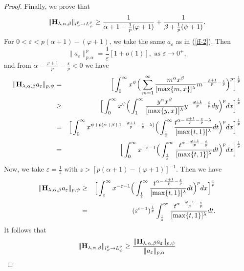\documentclass[10pt]{amsart}
\theoremstyle{definition}    %
\numberwithin{equation}{section}
\begin{document}
\begin{proof}
Finally, we prove that  $$\|{\bf H}_{\lambda, \alpha, \beta}\|_{l_{\varphi}^{p}\rightarrow L_{\psi}^p}\geq \frac{1}{\alpha+1-\frac{1}{p}(\varphi+1)}+\frac{1}{\beta+\frac{1}{p}(\psi+1)}.$$ 
For $0<\varepsilon<p(\alpha+1)-(\varphi+1)$, we take the same $a_{\varepsilon}$ as in (\ref{ff-2}). Then \begin{equation}\label{jia}\|a_{\varepsilon}\|_{p, \alpha}^p=\frac{1}{\varepsilon}[1+o(1)],\,\, {\text {as}}\,\, \varepsilon \rightarrow 0^{+},\end{equation}
and from $\alpha-\frac{\varphi+1}{p}-\frac{\varepsilon}{p}<0$ we have
\begin{eqnarray}
\|{\bf H}_{\lambda, \alpha, \beta}a_{\varepsilon}\|_{p, \psi}&=&\Big[\int_{0}^{\infty}x^{\psi}\Big(\sum_{m=1}^{\infty}\frac{m^{\alpha}x^{\beta}}{[\max\{m,x\}]^{\lambda}}m^{-\frac{\varphi+1}{p}-\frac{\varepsilon}{p}}\Big)^p\Big]^{\frac{1}{p}} \nonumber 
\\
&\geq & \Big[\int_{0}^{\infty}x^{\psi}\Big(\int_{1}^{\infty}\frac{y^{\alpha}x^{\beta}}{[\max\{y,x\}]^{\lambda}}y^{-\frac{\varphi+1}{p}-\frac{\varepsilon}{p}}dy\Big)^p dx\Big]^{\frac{1}{p}} \nonumber \\
&=& \Big[\int_{0}^{\infty}x^{\psi+p(\alpha+\beta+1-\frac{\varphi+1}{p}-\frac{\varepsilon}{p}-\lambda)}\Big(\int_{\frac{1}{x}}^{\infty}\frac{t^{\alpha-\frac{\varphi+1}{p}-\frac{\varepsilon}{p}-\lambda}}{[\max\{t,1\}]^{\lambda}}dt\Big)^p dx\Big]^{\frac{1}{p}}\nonumber
\\
&=& \Big[\int_{0}^{\infty}x^{-\varepsilon-1}\Big(\int_{\frac{1}{x}}^{\infty}\frac{t^{\alpha-\frac{\varphi+1}{p}-\frac{\varepsilon}{p}}}{[\max\{t,1\}]^{\lambda}}dt\Big)^p dx\Big]^{\frac{1}{p}}\nonumber
\end{eqnarray} 
Now, we take $\varepsilon=\frac{1}{z}$ with $z>[p(\alpha+1)-(\varphi+1)]^{-1}$. Then we have 
\begin{eqnarray}
\|{\bf H}_{\lambda, \alpha, \beta}a_{\varepsilon}\|_{p, \psi}&\geq & \Big[\int_{z}^{\infty}x^{-\varepsilon-1}\Big(\int_{\frac{1}{z}}^{\infty}\frac{t^{\alpha-\frac{\varphi+1}{p}-\frac{\varepsilon}{p}}}{[\max\{t,1\}]^{\lambda}}dt\Big)^p dx\Big]^{\frac{1}{p}} \nonumber 
\\
&=& (\varepsilon^{\varepsilon-1})^{\frac{1}{p}}\int_{\frac{1}{z}}^{\infty}\frac{t^{\alpha-\frac{\varphi+1}{p}-\frac{\varepsilon}{p}}}{[\max\{t,1\}]^{\lambda}}dt.  \nonumber
\end{eqnarray} 
It follows that 
\begin{eqnarray}\label{m-s} \|\mathbf{H}_{\lambda, \alpha, \beta}\|_{l_{\varphi}^p \rightarrow L_{\psi}^p} \geq \frac{\|{\bf H}_{\lambda, \alpha, \beta}a_{\varepsilon}\|_{p, \psi}}{\|a_{\varepsilon}\|_{p, \alpha}}

\end{eqnarray}
\end{proof}
\end{document}
